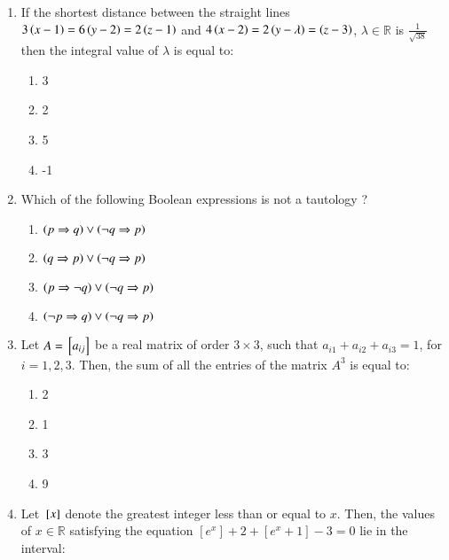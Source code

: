 \documentclass[journal]{IEEEtran}
\begin{document}
\begin{enumerate}
{\begin{multicols}{4}
\begin{enumerate}
\item $\lambda \neq 2, \mu = 10$
\item $\lambda = 2, \mu \neq 10$
\end{enumerate}
\end{multicols}
}
\item{
If the shortest distance between the straight lines $3\left(x-1\right)=6\left(y-2\right)=2\left(z-1\right)$ and $4\left(x-2\right)=2\left(y-\lambda\right)=\left(z-3\right)$, $\lambda \in \mathbb{R}$ is $\frac{1}{\sqrt{38}}$then the integral value of $\lambda$ is equal to:
\begin{multicols}{4}
\begin{enumerate}
\item 3
\item 2
\item 5
\item -1
\end{enumerate}
\end{multicols}
}
\item{
Which of the following Boolean expressions is not a tautology ?
\begin{multicols}{2}
\begin{enumerate}
\item $\left(p \Rightarrow q\right) \lor \left(\neg q \Rightarrow p\right)$
\item $\left(q \Rightarrow p\right) \lor \left(\neg q \Rightarrow p\right)$
\item $\left(p \Rightarrow \neg q\right) \lor \left(\neg q \Rightarrow p\right)$
\item $\left(\neg p \Rightarrow q\right) \lor \left(\neg q \Rightarrow p\right)$
\end{enumerate}
\end{multicols}
}
\item{
Let $A={}\left[a_{ij}\right]$ be a real matrix of order $3 \times 3$, such that $a_{i1}+a_{i2}+a_{i3}=1$, for $i=1,2,3$. Then, the sum of all the entries of the matrix $A^3$ is equal to:
\begin{multicols}{4}
\begin{enumerate}
\item 2
\item 1
\item 3
\item 9
\end{enumerate}
\end{multicols}
}
\item{
Let ${}\left[x\right]$ denote the greatest integer less than or equal to $x$. Then, the values of $x \in \mathbb{R}$ satisfying the equation $[e^x] + 2 + [e^{x}+1] - 3 = 0$ lie in the interval:
}
\end{enumerate}
\end{document}
